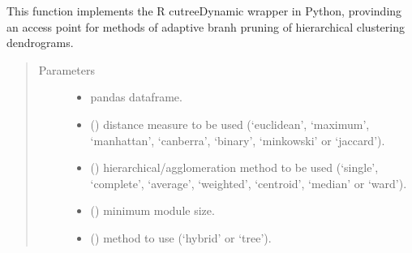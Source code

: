 \documentclass[letterpaper,10pt,english]{sphinxmanual}
\begin{document}

\begin{fulllineitems}
\label{\detokenize{_autosummary/analytics_core.analytics:analytics_core.analytics.wgcnaAnalysis.cutreeDynamic}}
This function implements the R cutreeDynamic wrapper in Python, provinding an access point for methods of adaptive branh pruning of hierarchical clustering dendrograms.
\begin{quote}\begin{description}
\item[{Parameters}] \leavevmode\begin{itemize}
\item {} 
 \textendash{} pandas dataframe.

\item {} 
 () \textendash{} distance measure to be used (‘euclidean’, ‘maximum’, ‘manhattan’, ‘canberra’, ‘binary’, ‘minkowski’ or ‘jaccard’).

\item {} 
 () \textendash{} hierarchical/agglomeration method to be used (‘single’, ‘complete’, ‘average’, ‘weighted’, ‘centroid’, ‘median’ or ‘ward’).

\item {} 
 () \textendash{} minimum module size.

\item {} 
 () \textendash{} method to use (‘hybrid’ or ‘tree’).


\end{itemize}
\end{description}
\end{quote}
\end{fulllineitems}
\end{document}
